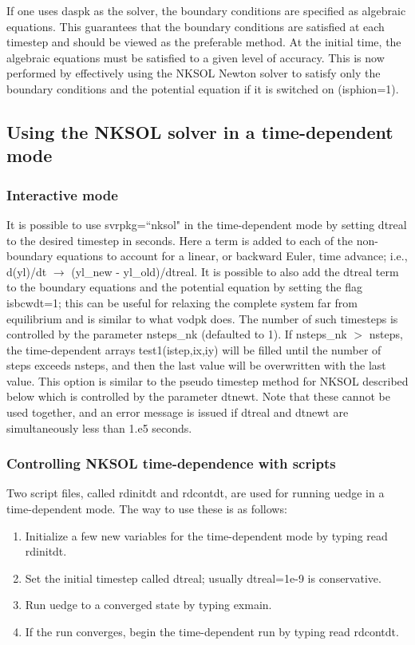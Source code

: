 \documentclass [12pt]{article}
\begin{document}
If one uses daspk as the solver, the boundary conditions are specified as
algebraic equations.  This guarantees that the boundary conditions are
satisfied at each timestep and should be viewed as the preferable method.
At the initial time, the algebraic equations must be satisfied to a given
level of accuracy.  This is now performed by effectively using the {\sf NKSOL}
Newton solver to satisfy only the boundary conditions and the potential
equation if it is switched on ({\sf isphion}=1).

\subsection{Using the {\sf NKSOL} solver in a time-dependent mode} 
\label{dtnksol}
\subsubsection{Interactive mode}
It is possible to use svrpkg=``nksol" in the time-dependent mode by setting
dtreal to the desired timestep in seconds.  Here a term is added to each of
the non-boundary equations to account for a linear, or backward Euler, time
advance; i.e., d(yl)/dt $\rightarrow$ ({\sf yl}\_new - yl\_old)/dtreal. It is
possible to also add the dtreal term to the boundary equations and the
potential equation by setting the flag isbcwdt=1; this can be useful for
relaxing the complete system far from equilibrium and is similar to what {\sf
vodpk} does.  The number of such timesteps is controlled by the parameter {\sf
nsteps\_nk} (defaulted to 1).  If {\sf nsteps\_nk} $>$ {\sf nsteps}, the
time-dependent arrays test1(istep,ix,iy) will be filled until the number of
steps exceeds {\sf nsteps}, and then the last value will be overwritten with
the last value.  This option is similar to the pseudo timestep method for {\sf
NKSOL} described below which is controlled by the parameter {\sf dtnewt}.
Note that these cannot be used together, and an error message is issued if
{\sf dtreal} and {\sf dtnewt} are simultaneously less than 1.e5 seconds.

\subsubsection{Controlling NKSOL time-dependence with scripts}
Two script files, called {\sf rdinitdt} and {\sf rdcontdt}, are used for 
running uedge in a time-dependent mode.  The way to use these is as follows:
%
\begin{enumerate}
 \item Initialize a few new variables for the time-dependent mode by typing 
       {\sf read rdinitdt}.
 \item Set the initial timestep called {\sf dtreal}; usually {\sf dtreal=1e-9}
       is conservative.
 \item Run uedge to a converged state by typing {\sf exmain}.
 \item If the run converges, begin the time-dependent run by typing 
       {\sf read rdcontdt}.
\end{enumerate}
\end{document}
